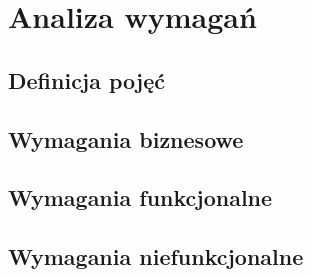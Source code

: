 \chapter{Analiza wymagań}
\label{cha:inzyneriaWymagan}

\section{Definicja pojęć}
\label{cha:definicjaPojec}

\section{Wymagania biznesowe}
\label{sec:wymaganiaBiznesowe}

\section{Wymagania funkcjonalne}
\label{sec:wymaganiaFunkcjonalne}

\section{Wymagania niefunkcjonalne}
\label{sec;wymaganiaNiefunkcjonalne}
